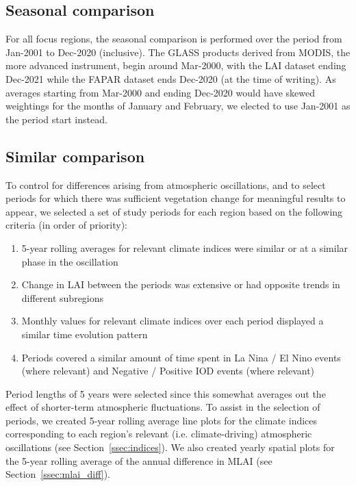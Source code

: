 \subsection{Seasonal comparison}

For all focus regions, the seasonal comparison is performed over the period from Jan-2001 to Dec-2020 (inclusive). The GLASS products derived from \ac{MODIS}, the more advanced instrument, begin around Mar-2000, with the \ac{LAI} dataset ending Dec-2021 while the \ac{FAPAR} dataset ends Dec-2020 (at the time of writing). As averages starting from Mar-2000 and ending Dec-2020 would have skewed weightings for the months of January and February, we elected to use Jan-2001 as the period start instead.

\subsection{Similar comparison}

To control for differences arising from atmospheric oscillations, and to select periods for which there was sufficient vegetation change for meaningful results to appear, we selected a set of study periods for each region based on the following criteria (in order of priority):
\begin{enumerate}
	\item 5-year rolling averages for relevant climate indices were similar or at a similar phase in the oscillation
	\item Change in \ac{LAI} between the periods was extensive or had opposite trends in different subregions
	\item Monthly values for relevant climate indices over each period displayed a similar time evolution pattern
	\item Periods covered a similar amount of time spent in La Nina / El Nino events (where relevant) and Negative / Positive \ac{IOD} events (where relevant)
\end{enumerate}

Period lengths of 5 years were selected since this somewhat averages out the effect of shorter-term atmospheric fluctuations. To assist in the selection of periods, we created 5-year rolling average line plots for the climate indices corresponding to each region's relevant (i.e. climate-driving) atmospheric oscillations (see Section~\ref{ssec:indices}). We also created yearly spatial plots for the 5-year rolling average of the annual difference in \ac{MLAI} (see Section~\ref{ssec:mlai_diff}).

